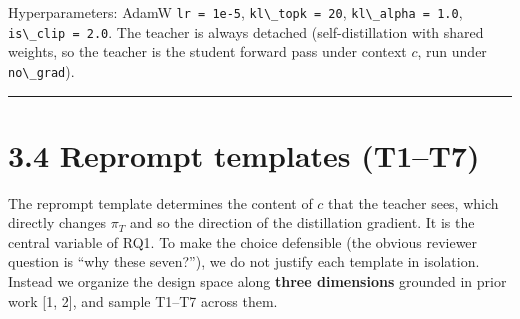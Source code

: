 Hyperparameters: AdamW \passthrough{\lstinline!lr = 1e-5!}, \passthrough{\lstinline!kl\_topk = 20!}, \passthrough{\lstinline!kl\_alpha = 1.0!}, \passthrough{\lstinline!is\_clip = 2.0!}. The teacher is always detached (self-distillation with shared weights, so the teacher is the student forward pass under context \(c\), run under \passthrough{\lstinline!no\_grad!}).

\begin{center}\rule{0.5\linewidth}{0.5pt}\end{center}

\section{3.4 Reprompt templates (T1--T7)}\label{reprompt-templates-t1t7}

The reprompt template determines the content of \(c\) that the teacher sees, which directly changes \(\pi_T\) and so the direction of the distillation gradient. It is the central variable of RQ1. To make the choice defensible (the obvious reviewer question is ``why these seven?''), we do not justify each template in isolation. Instead we organize the design space along \textbf{three dimensions} grounded in prior work {[}1, 2{]}, and sample T1--T7 across them.

